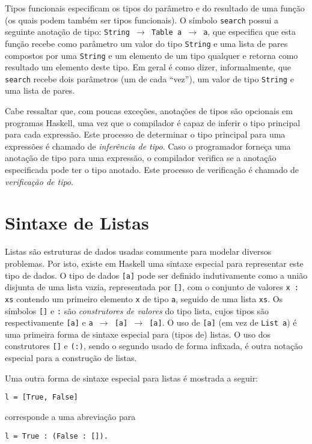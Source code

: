 Tipos funcionais especificam os tipos do par\^ametro e do resultado de uma
fun\c{c}\~ao (os quais podem tamb\'em ser tipos funcionais). O s\'imbolo \texttt{search} possui a 
seguinte anota\c{c}\~ao de tipo: \texttt{String $\rightarrow$ Table a $\rightarrow$ a}, que especifica que esta 
fun\c{c}\~ao recebe como par\^ametro um valor do tipo \texttt{String} e uma lista de pares
compostos por uma \texttt{String} e um elemento de um tipo qualquer e retorna como resultado um elemento 
deste tipo. Em geral \'e como dizer, informalmente, que \texttt{search} recebe dois par\^ametros (um de cada ``vez''),
um valor de tipo \texttt{String} e uma lista de pares.

Cabe ressaltar que, com poucas exce\c{c}\~oes, anota\c{c}\~oes de tipos s\~ao
opcionais em programas Haskell, uma vez que o compilador \'e capaz de inferir
o tipo principal para cada express\~ao. Este processo de determinar o
tipo principal para uma express\~oes \'e chamado de \emph{infer\^encia de
tipo}. Caso o programador forne\c{c}a uma anota\c{c}\~ao de tipo para uma express\~ao, 
o compilador verifica se a anota\c{c}\~ao especificada pode
ter o tipo anotado. Este processo de verifica\c{c}\~ao \'e chamado de
\emph{verifica\c{c}\~ao de tipo}.

\section{Sintaxe de Listas}


Listas s\~ao estruturas de dados usadas comumente para modelar diversos
problemas. Por isto, existe em Haskell uma sintaxe especial para representar este tipo de dados. 
O tipo de dados \texttt{[a]} pode ser definido indutivamente como a uni\~ao disjunta de uma lista vazia, 
representada por \texttt{[]}, com o conjunto de valores \texttt{x : xs} contendo um primeiro 
elemento \texttt{x} de tipo \texttt{a}, seguido de uma lista \texttt{xs}. Os s\'imbolos \texttt{[]}
e \texttt{:} s\~ao \emph{construtores de valores} do tipo lista, cujos tipos s\~ao
respectivamente \texttt{[a]} e \texttt{a $\rightarrow$ [a] $\rightarrow$ [a]}. O uso de \texttt{[a]} (em vez de
\texttt{List a}) \'e uma primeira forma de sintaxe especial para (tipos de) listas. O uso dos construtores \texttt{[]}
e \texttt{(:)}, sendo o segundo usado de forma infixada, \'e outra nota\c{c}\~ao especial para a constru\c{c}\~ao de 
listas.

Uma outra forma de sintaxe especial para listas \'e mostrada a seguir:
\begin{verbatim} 
l = [True, False] 
\end{verbatim}
corresponde a uma abrevia\c{c}\~ao para
\begin{verbatim} 
l = True : (False : []). 
\end{verbatim}

